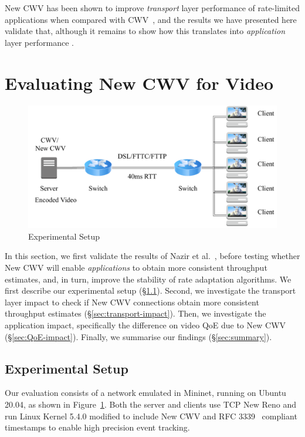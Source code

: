 \documentclass[10pt,sigconf]{acmart}
\begin{document}
New CWV has been shown to improve \emph{transport} layer performance of rate-limited applications when compared with CWV~\cite{Nazir-2014-performance-evaluation-congestion-window-validation-dash-newcwv}, and the results we have presented here validate that, although it remains to show how this translates into \emph{application} layer performance \cite{Spiteri-2016-BOLA}. 

\section{Evaluating New CWV for Video}
\label{sec:evaluation}

\begin{figure}
  \centering
  \includegraphics[width=.45\textwidth]{figures/setup.pdf}
  \caption{Experimental Setup}
  \label{fig:experimental-setup}
\end{figure}

In this section, we first validate the results of Nazir et al.~\cite{Nazir-2014-performance-evaluation-congestion-window-validation-dash-newcwv}, before testing whether New CWV will enable \emph{applications} to obtain more consistent throughput estimates, and, in turn, improve the stability of rate adaptation algorithms.
We first describe our experimental setup (\S\ref{sec:experimental-setup}). Second, we investigate the transport layer impact to check if New CWV connections obtain more consistent throughput estimates (\S\ref{sec:transport-impact}). Then, we investigate the application impact, specifically the difference on video QoE due to New CWV (\S\ref{sec:QoE-impact}). Finally, we summarise our findings (\S\ref{sec:summary}).

\subsection{Experimental Setup}
\label{sec:experimental-setup}

Our evaluation consists of a network emulated in Mininet, running on Ubuntu 20.04, as shown in Figure~\ref{fig:experimental-setup}. Both the server and clients use TCP New Reno and run Linux Kernel 5.4.0 modified to include New CWV and RFC 3339~\cite{rfc3339-precise-timestamps} compliant timestamps to enable high precision event tracking. 
\end{document}

